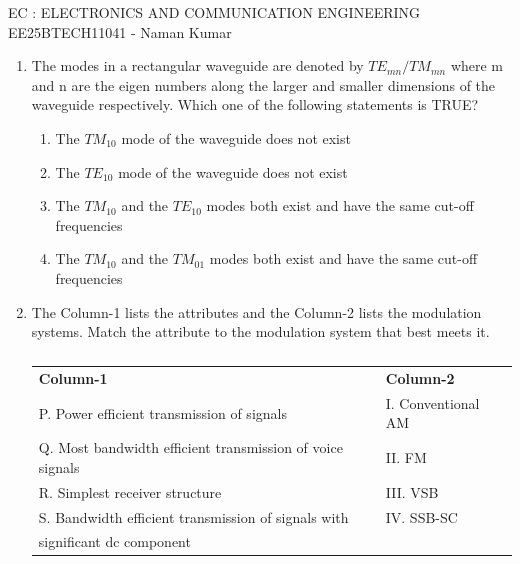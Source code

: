 \documentclass[a4paper, 11pt]{article}
\begin{document}
\begin{center}
    \huge{EC : ELECTRONICS AND COMMUNICATION ENGINEERING}\\
    \large{EE25BTECH11041 - Naman Kumar}
\end{center}

\begin{enumerate}
    \item The modes in a rectangular waveguide are denoted by $TE_{mn}/TM_{mn}$ where m and n are the eigen numbers along the larger and smaller dimensions of the waveguide respectively. Which one of the following statements is TRUE?
    
    \begin{enumerate}
        \item The $TM_{10}$ mode of the waveguide does not exist
        \item The $TE_{10}$ mode of the waveguide does not exist
        \item The $TM_{10}$ and the $TE_{10}$ modes both exist and have the same cut-off frequencies
        \item The $TM_{10}$ and the $TM_{01}$ modes both exist and have the same cut-off frequencies
    \end{enumerate}

    \hfill{}

    \item The Column-1 lists the attributes and the Column-2 lists the modulation systems. Match the attribute to the modulation system that best meets it.
    
    \begin{table}[H]
        \centering
        \begin{tabular}{ll}
            \textbf{Column-1} & \textbf{Column-2} \\
            P. Power efficient transmission of signals & I. Conventional AM \\
            Q. Most bandwidth efficient transmission of voice signals & II. FM \\
            R. Simplest receiver structure & III. VSB \\
            S. Bandwidth efficient transmission of signals with & IV. SSB-SC \\
            \quad significant dc component & \\
        \end{tabular}
        \caption*{}
        \label{tab:q2}
    \end{table}
    

\end{enumerate}
\end{document}
